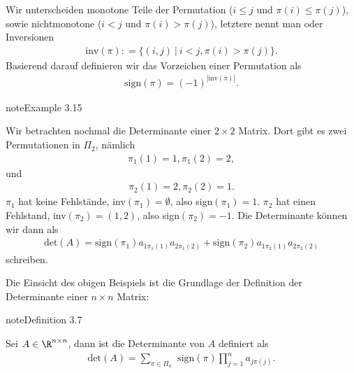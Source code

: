 \documentclass[letterpaper,10pt,english]{jupyterBook}
\begin{document}
Wir unterscheiden monotone Teile der Permutation (\(i \leq j\) und \(\pi(i) \leq \pi(j)\)), sowie nichtmonotone (\(i < j\) und \(\pi(i) > \pi(j)\)), letztere nennt man  oder Inversionen
\begin{equation*}
\begin{split} \text{inv}(\pi): = \{(i,j)~|~i<j, \pi(i) > \pi(j) \}.\end{split}
\end{equation*}
Basierend darauf definieren wir das Vorzeichen einer Permutation als
\begin{equation*}
\begin{split} \text{sign}(\pi) =(-1)^{|\text{inv}(\pi)|}.\end{split}
\end{equation*}\label{vektorraeume/LGS:example-11}
\begin{sphinxadmonition}{note}{Example 3.15}



Wir betrachten nochmal die Determinante einer \(2 \times 2\) Matrix. Dort gibt es zwei Permutationen in \(\Pi_2\), nämlich
\begin{equation*}
\begin{split} \pi_1(1)=1, \pi_1(2)=2,\end{split}
\end{equation*}
und
\begin{equation*}
\begin{split} \pi_2(1)=2, \pi_2(2)=1.\end{split}
\end{equation*}
\(\pi_1\) hat keine Fehlstände, inv\((\pi_1)=\emptyset\), also sign\((\pi_1)=1\). \(\pi_2\) hat einen Fehlstand, inv\((\pi_2)={(1,2)}\),
also  sign\((\pi_2)=-1\). Die Determinante können wir dann als
\begin{equation*}
\begin{split} \text{det}(A) =  \text{sign}(\pi_1) a_{1\pi_1(1)} a_{2\pi_1(2)} + \text{sign}(\pi_2) a_{1\pi_2(1)} a_{2\pi_2(2)} \end{split}
\end{equation*}
schreiben.
\end{sphinxadmonition}

Die Einsicht des obigen Beispiels ist die Grundlage der Definition der Determinante einer \(n \times n\) Matrix:
\label{vektorraeume/LGS:definition-12}
\begin{sphinxadmonition}{note}{Definition 3.7}



Sei \(A \in \R^{n \times n}\), dann ist die Determinante von \(A\) definiert als
\begin{equation*}
\begin{split} \text{det}(A) = \sum_{\pi \in \Pi_n} \text{ sign}(\pi) \prod_{j=1}^n a_{j \pi(j)}.\end{split}
\end{equation*}\end{sphinxadmonition}
\end{document}
